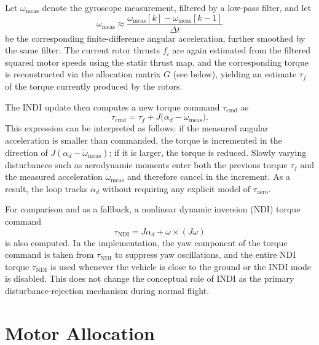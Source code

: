 Let $\omega_{\mathrm{meas}}$ denote the gyroscope measurement, filtered by a
low-pass filter, and let
\begin{equation}
    \dot{\omega}_{\mathrm{meas}} \approx
    \frac{\omega_{\mathrm{meas}}[k] - \omega_{\mathrm{meas}}[k-1]}{\Delta t}
\end{equation}
be the corresponding finite-difference angular acceleration, further smoothed
by the same filter. The current rotor thrusts $f_i$ are again estimated from the
filtered squared motor speeds using the static thrust map, and the corresponding
torque is reconstructed via the allocation matrix $G$ (see below), yielding an
estimate $\tau_f$ of the torque currently produced by the rotors.

The INDI update then computes a new torque command $\tau_{\mathrm{cmd}}$ as
\begin{equation}
    \tau_{\mathrm{cmd}} =
      \tau_f
    + J \bigl( \alpha_d - \dot{\omega}_{\mathrm{meas}} \bigr).
\end{equation}
This expression can be interpreted as follows: if the measured angular
acceleration is smaller than commanded, the torque is incremented in the
direction of $J (\alpha_d - \dot{\omega}_{\mathrm{meas}})$; if it is larger, the
torque is reduced. Slowly varying disturbances such as aerodynamic moments enter
both the previous torque $\tau_f$ and the measured acceleration
$\dot{\omega}_{\mathrm{meas}}$ and therefore cancel in the increment. As a
result, the loop tracks $\alpha_d$ without requiring any explicit model of
$\tau_{\mathrm{aero}}$.

For comparison and as a fallback, a nonlinear dynamic inversion (NDI) torque
command
\begin{equation}
    \tau_{\mathrm{NDI}} = J \alpha_d + \omega \times (J \omega)
\end{equation}
is also computed. In the implementation, the yaw component of the torque command
is taken from $\tau_{\mathrm{NDI}}$ to suppress yaw oscillations, and the entire
NDI torque $\tau_{\mathrm{NDI}}$ is used whenever the vehicle is close to the
ground or the INDI mode is disabled. This does not change the conceptual role of
INDI as the primary disturbance-rejection mechanism during normal flight.

\section{Motor Allocation}

